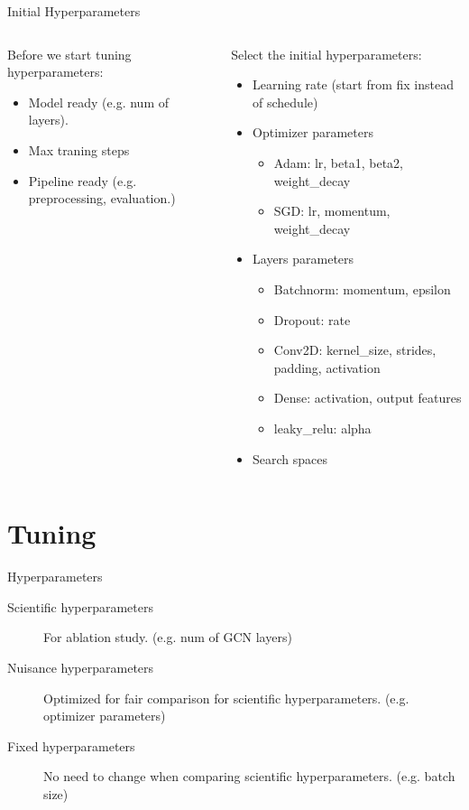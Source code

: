 \documentclass[aspectratio=1610,xcolor={dvipsnames},hyperref={colorlinks,unicode,linkcolor=violet,anchorcolor=BlueViolet,citecolor=YellowOrange,filecolor=black,urlcolor=Aquamarine}]{beamer}
\begin{document}
\begin{frame}[label={sec:org06d3840}]{Initial Hyperparameters}
\begin{columns}
\begin{column}{0.4\columnwidth}
Before we start tuning hyperparameters:

\begin{itemize}
\item Model ready (e.g. num of layers).
\item Max traning steps
\item Pipeline ready (e.g. preprocessing, evaluation.)
\end{itemize}
\end{column}

\begin{column}{0.4\columnwidth}
Select the initial hyperparameters:

\begin{itemize}
\item Learning rate (start from fix instead of schedule)
\item Optimizer parameters
\begin{itemize}
\item Adam: lr, beta1, beta2, weight\_decay
\item SGD: lr, momentum, weight\_decay
\end{itemize}
\item Layers parameters
\begin{itemize}
\item Batchnorm: momentum, epsilon
\item Dropout: rate
\item Conv2D: kernel\_size, strides, padding, activation
\item Dense: activation, output features
\item leaky\_relu: alpha
\end{itemize}
\item Search spaces
\end{itemize}
\end{column}
\end{columns}
\end{frame}

\section{Tuning}
\label{sec:org0516a21}

\begin{frame}[label={sec:org50eabc2}]{Hyperparameters}
\begin{description}
\item[{Scientific hyperparameters}] For ablation study. (e.g. num of GCN layers)
\item[{Nuisance hyperparameters}] Optimized for fair comparison for scientific hyperparameters.  (e.g. optimizer parameters)
\item[{Fixed hyperparameters}] No need to change when comparing scientific hyperparameters. (e.g. batch size)
\end{description}
\end{frame}
\end{document}
